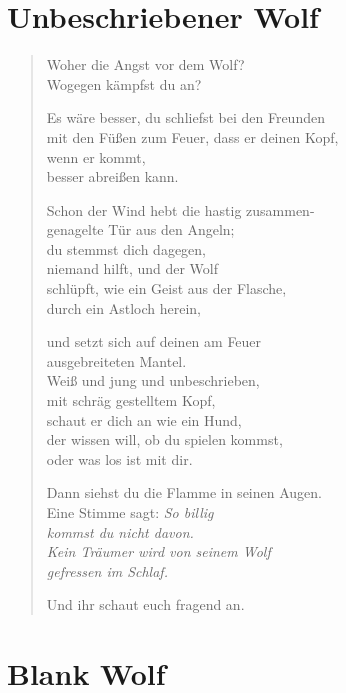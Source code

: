 
\cleartoverso

\section{Unbeschriebener Wolf}

\begin{verse}

Woher die Angst vor dem Wolf?\\
Wogegen kämpfst du an?

Es wäre besser, du schliefst bei den Freunden\\
mit den Füßen zum Feuer, dass er deinen Kopf,\\
wenn er kommt,\\
besser abreißen kann.

Schon der Wind hebt die hastig zusammen-\\
genagelte Tür aus den Angeln;\\
du stemmst dich dagegen,\\
niemand hilft, und der Wolf\\
schlüpft, wie ein Geist aus der Flasche,\\
durch ein Astloch herein,

und setzt sich auf deinen am Feuer\\
ausgebreiteten Mantel.\\
Weiß und jung und unbeschrieben,\\
mit schräg gestelltem Kopf,\\
schaut er dich an wie ein Hund,\\
der wissen will, ob du spielen kommst,\\
oder was los ist mit dir.

\clearpage

Dann siehst du die Flamme in seinen Augen.\\
Eine Stimme sagt: {\itshape So billig\\
kommst du nicht davon.\\
Kein Träumer wird von seinem Wolf\\
gefressen im Schlaf.}

Und ihr schaut euch fragend an.

\end{verse}

\clearpage

\section{Blank Wolf}

